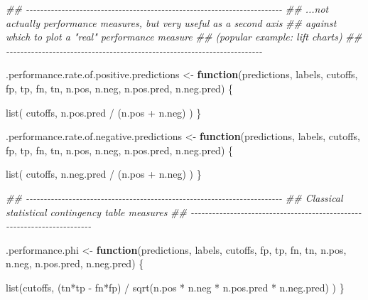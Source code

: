 \documentclass[
  letterpaper,
  DIV=11,
  numbers=noendperiod]{scrartcl}
\newenvironment{Shaded}{\begin{snugshade}}{\end{snugshade}}
\newcommand{\ControlFlowTok}[1]{\textcolor[rgb]{0.00,0.23,0.31}{\textbf{#1}}}
\newcommand{\DocumentationTok}[1]{\textcolor[rgb]{0.37,0.37,0.37}{\textit{#1}}}
\newcommand{\FunctionTok}[1]{\textcolor[rgb]{0.28,0.35,0.67}{#1}}
\newcommand{\NormalTok}[1]{\textcolor[rgb]{0.00,0.23,0.31}{#1}}
\newcommand{\OtherTok}[1]{\textcolor[rgb]{0.00,0.23,0.31}{#1}}
\newcommand{\SpecialCharTok}[1]{\textcolor[rgb]{0.37,0.37,0.37}{#1}}
\begin{document}
\begin{Shaded}
\begin{Highlighting}[]
\DocumentationTok{\#\# {-}{-}{-}{-}{-}{-}{-}{-}{-}{-}{-}{-}{-}{-}{-}{-}{-}{-}{-}{-}{-}{-}{-}{-}{-}{-}{-}{-}{-}{-}{-}{-}{-}{-}{-}{-}{-}{-}{-}{-}{-}{-}{-}{-}{-}{-}{-}{-}{-}{-}{-}{-}{-}{-}{-}{-}{-}{-}{-}{-}{-}{-}{-}{-}{-}{-}{-}{-}{-}{-}{-}{-}}
\DocumentationTok{\#\# ...not actually performance measures, but very useful as a second axis}
\DocumentationTok{\#\# against which to plot a "real" performance measure}
\DocumentationTok{\#\# (popular example: lift charts)}
\DocumentationTok{\#\# {-}{-}{-}{-}{-}{-}{-}{-}{-}{-}{-}{-}{-}{-}{-}{-}{-}{-}{-}{-}{-}{-}{-}{-}{-}{-}{-}{-}{-}{-}{-}{-}{-}{-}{-}{-}{-}{-}{-}{-}{-}{-}{-}{-}{-}{-}{-}{-}{-}{-}{-}{-}{-}{-}{-}{-}{-}{-}{-}{-}{-}{-}{-}{-}{-}{-}{-}{-}{-}{-}{-}{-}}

\NormalTok{.performance.rate.of.positive.predictions }\OtherTok{\textless{}{-}}
  \ControlFlowTok{function}\NormalTok{(predictions, labels, cutoffs, fp, tp, fn, tn,}
\NormalTok{           n.pos, n.neg, n.pos.pred, n.neg.pred) \{}

      \FunctionTok{list}\NormalTok{( cutoffs, n.pos.pred }\SpecialCharTok{/}\NormalTok{ (n.pos }\SpecialCharTok{+}\NormalTok{ n.neg) )}
\NormalTok{  \}}

\NormalTok{.performance.rate.of.negative.predictions }\OtherTok{\textless{}{-}}
  \ControlFlowTok{function}\NormalTok{(predictions, labels, cutoffs, fp, tp, fn, tn,}
\NormalTok{           n.pos, n.neg, n.pos.pred, n.neg.pred) \{}

      \FunctionTok{list}\NormalTok{( cutoffs, n.neg.pred }\SpecialCharTok{/}\NormalTok{ (n.pos }\SpecialCharTok{+}\NormalTok{ n.neg) )}
\NormalTok{  \}}


\DocumentationTok{\#\# {-}{-}{-}{-}{-}{-}{-}{-}{-}{-}{-}{-}{-}{-}{-}{-}{-}{-}{-}{-}{-}{-}{-}{-}{-}{-}{-}{-}{-}{-}{-}{-}{-}{-}{-}{-}{-}{-}{-}{-}{-}{-}{-}{-}{-}{-}{-}{-}{-}{-}{-}{-}{-}{-}{-}{-}{-}{-}{-}{-}{-}{-}{-}{-}{-}{-}{-}{-}{-}{-}{-}{-}}
\DocumentationTok{\#\# Classical statistical contingency table measures}
\DocumentationTok{\#\# {-}{-}{-}{-}{-}{-}{-}{-}{-}{-}{-}{-}{-}{-}{-}{-}{-}{-}{-}{-}{-}{-}{-}{-}{-}{-}{-}{-}{-}{-}{-}{-}{-}{-}{-}{-}{-}{-}{-}{-}{-}{-}{-}{-}{-}{-}{-}{-}{-}{-}{-}{-}{-}{-}{-}{-}{-}{-}{-}{-}{-}{-}{-}{-}{-}{-}{-}{-}{-}{-}{-}{-}}

\NormalTok{.performance.phi }\OtherTok{\textless{}{-}}
  \ControlFlowTok{function}\NormalTok{(predictions, labels, cutoffs, fp, tp, fn, tn,}
\NormalTok{           n.pos, n.neg, n.pos.pred, n.neg.pred) \{}

      \FunctionTok{list}\NormalTok{(cutoffs,}
\NormalTok{           (tn}\SpecialCharTok{*}\NormalTok{tp }\SpecialCharTok{{-}}\NormalTok{ fn}\SpecialCharTok{*}\NormalTok{fp) }\SpecialCharTok{/} \FunctionTok{sqrt}\NormalTok{(n.pos }\SpecialCharTok{*}\NormalTok{ n.neg }\SpecialCharTok{*}\NormalTok{ n.pos.pred }\SpecialCharTok{*}\NormalTok{ n.neg.pred) )}
\NormalTok{  \}}


\end{Highlighting}
\end{Shaded}
\end{document}

